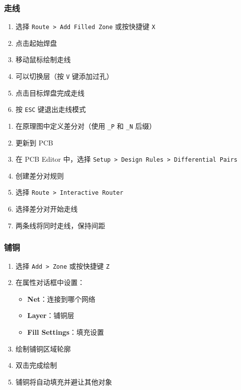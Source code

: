 \subsubsection{走线}


\begin{enumerate}
  \item 选择 \lstinline{Route > Add Filled Zone} 或按快捷键 \lstinline{X}
  \item 点击起始焊盘
  \item 移动鼠标绘制走线
  \item 可以切换层（按 \lstinline{V} 键添加过孔）
  \item 点击目标焊盘完成走线
  \item 按 \lstinline{ESC} 键退出走线模式
\end{enumerate}


\begin{enumerate}
  \item 在原理图中定义差分对（使用 \lstinline{_P} 和 \lstinline{_N} 后缀）
  \item 更新到 PCB
  \item 在 PCB Editor 中，选择 \lstinline{Setup > Design Rules > Differential Pairs}
  \item 创建差分对规则
  \item 选择 \lstinline{Route > Interactive Router}
  \item 选择差分对开始走线
  \item 两条线将同时走线，保持间距
\end{enumerate}

\subsubsection{铺铜}


\begin{enumerate}
  \item 选择 \lstinline{Add > Zone} 或按快捷键 \lstinline{Z}
  \item 在属性对话框中设置：
    \begin{itemize}
      \item \textbf{Net}：连接到哪个网络
      \item \textbf{Layer}：铺铜层
      \item \textbf{Fill Settings}：填充设置
    \end{itemize}
  \item 绘制铺铜区域轮廓
  \item 双击完成绘制
  \item 铺铜将自动填充并避让其他对象
\end{enumerate}

